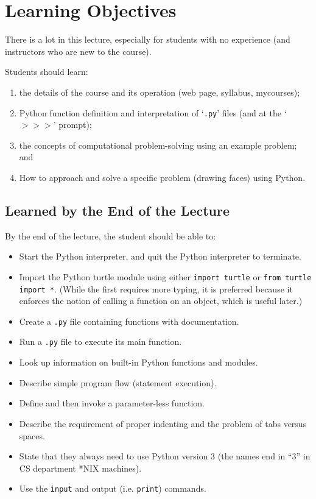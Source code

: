 \documentclass[pdftex,12pt]{artikel3}
\begin{document}
\newpage


\section{Learning Objectives} %

There is a lot in this lecture, especially for students with
no experience (and instructors who are new to the course).

Students should learn:
\begin{enumerate}
\item
the details of the course and its operation (web page, syllabus, mycourses);
\item
Python function definition and 
interpretation of `{\tt .py}' files (and at the `$>>>$' prompt);
\item
the concepts of computational problem-solving using an example problem;
and
\item
How to approach and solve a specific problem (drawing faces) using Python.
\end{enumerate}

\subsection{Learned by the End of the Lecture}

By the end of the lecture, the student should be able to:
\begin{itemize}
\item
  Start the Python interpreter, and quit the Python interpreter to terminate.
\item
  Import the Python turtle module
  using either {\tt import turtle} or {\tt from turtle import *}.
  (While the first requires more typing, it is preferred because it 
  enforces the notion of calling a function on an object, which is useful later.)
\item
  Create a {\tt .py} file containing functions with documentation.
\item
  Run a {\tt .py} file to execute its main function.
\item
  Look up information on built-in Python functions and modules.
\item
  Describe simple program flow (statement execution).
\item
  Define and then invoke a parameter-less function.
\item
  Describe the requirement of proper indenting
  and the problem of tabs versus spaces.
\item
  State that they always need to use Python version 3
  (the names end in ``3'' in CS department *NIX machines).
\item
  Use the {\tt input} and output (i.e. {\tt print}) commands.
\end{itemize}
\end{document}
